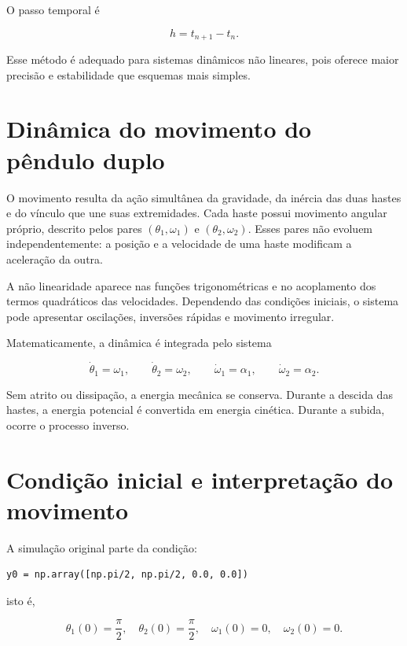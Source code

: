 \documentclass[12pt,a4paper]{article}
\begin{document}
O passo temporal é

\begin{equation}
h=t_{n+1}-t_n.
\end{equation}

Esse método é adequado para sistemas dinâmicos não lineares, pois oferece maior precisão e estabilidade que esquemas mais simples.

\section{Dinâmica do movimento do pêndulo duplo}

O movimento resulta da ação simultânea da gravidade, da inércia das duas hastes e do vínculo que une suas extremidades. Cada haste possui movimento angular próprio, descrito pelos pares $(\theta_1,\omega_1)$ e $(\theta_2,\omega_2)$. Esses pares não evoluem independentemente: a posição e a velocidade de uma haste modificam a aceleração da outra.

A não linearidade aparece nas funções trigonométricas e no acoplamento dos termos quadráticos das velocidades. Dependendo das condições iniciais, o sistema pode apresentar oscilações, inversões rápidas e movimento irregular.

Matematicamente, a dinâmica é integrada pelo sistema

\begin{equation}
\dot{\theta}_1=\omega_1,
\qquad
\dot{\theta}_2=\omega_2,
\qquad
\dot{\omega}_1=\alpha_1,
\qquad
\dot{\omega}_2=\alpha_2.
\end{equation}

Sem atrito ou dissipação, a energia mecânica se conserva. Durante a descida das hastes, a energia potencial é convertida em energia cinética. Durante a subida, ocorre o processo inverso.

\section{Condição inicial e interpretação do movimento}

A simulação original parte da condição:

\begin{lstlisting}
y0 = np.array([np.pi/2, np.pi/2, 0.0, 0.0])
\end{lstlisting}

isto é,

\begin{equation}
\theta_1(0)=\frac{\pi}{2},
\quad
\theta_2(0)=\frac{\pi}{2},
\quad
\omega_1(0)=0,
\quad
\omega_2(0)=0.
\end{equation}
\end{document}
